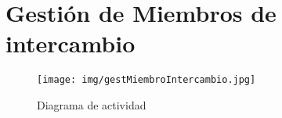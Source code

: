 \pagebreak
\section{Gestión de Miembros de intercambio}

\begin{figure}[!h]
  \centering
    \texttt{[image: img/gestMiembroIntercambio.jpg]}
    \caption{Diagrama de actividad}
\end{figure}